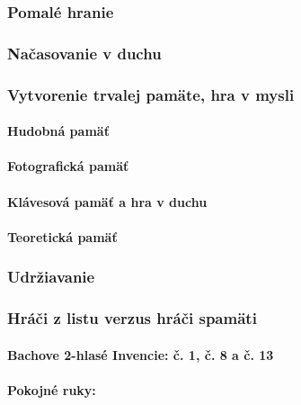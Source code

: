 \subsubsection{Pomalé hranie}

\subsubsection{Načasovanie v duchu}

\subsubsection{Vytvorenie trvalej pamäte, hra v mysli}

\paragraph{Hudobná pamäť}

\paragraph{Fotografická pamäť} 

\paragraph{Klávesová pamäť a hra v duchu} 

\paragraph{Teoretická pamäť}

\subsubsection{Udržiavanie}

\subsubsection{Hráči z listu verzus hráči spamäti}

\paragraph{Bachove 2-hlasé Invencie: č. 1, č. 8 a č. 13} 

\paragraph{Pokojné ruky:}

